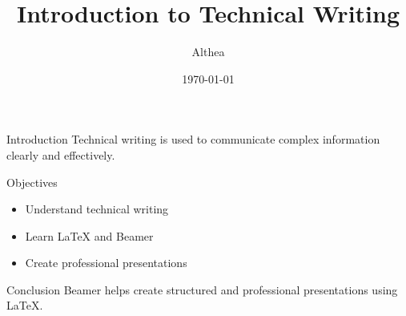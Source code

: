 \documentclass{beamer}
\title{Introduction to Technical Writing}
\author{Althea}
\institute{MNIT}
\date{\today}
\begin{document}
\begin{frame}
\titlepage
\end{frame}

\begin{frame}{Introduction}
Technical writing is used to communicate
complex information clearly and effectively.
\end{frame}

\begin{frame}{Objectives}
\begin{itemize}
    \item Understand technical writing
    \item Learn LaTeX and Beamer
    \item Create professional presentations
\end{itemize}
\end{frame}

\begin{frame}{Conclusion}
Beamer helps create structured and
professional presentations using LaTeX.
\end{frame}
\end{document}
